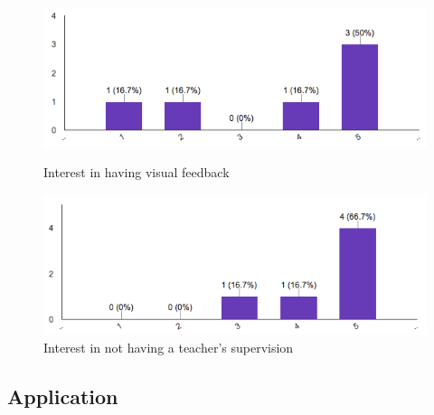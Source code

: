 \begin{figure}[!ht]
	\centering
	\begin{minipage}{.5\textwidth}
		\centering
		\includegraphics[scale=0.5]{Figures/responses/interest_visual_feedback.png}
		\caption{Interest in having visual feedback}
		\label{fig:int_visual_feedbak}
	\end{minipage}%
	\begin{minipage}{.5\textwidth}
		\centering
		\includegraphics[scale=0.5]{Figures/responses/interest_no_teacher.png}
		\caption{Interest in not having a teacher's supervision}
		\label{fig:int_no_teacher}
	\end{minipage}
\end{figure}


\subsection*{Application}
\label{sub:Application}
